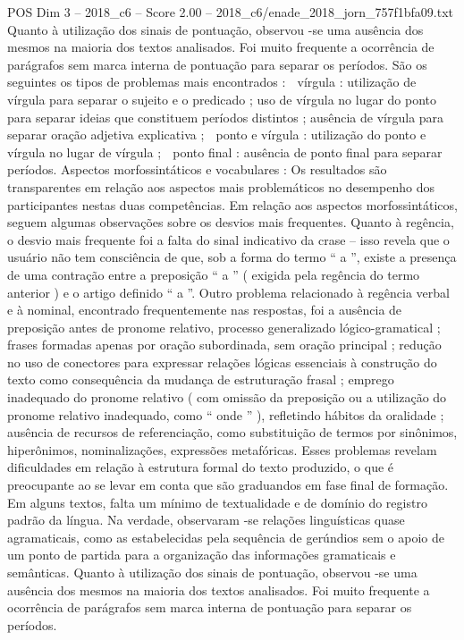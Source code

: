 \begin{textsample}{POS Dim 3 – 2018\_c6 – Score 2.00 – 2018\_c6/enade\_2018\_jorn\_757f1bfa09.txt}
Quanto à utilização dos sinais de pontuação, observou -se uma ausência dos mesmos na maioria dos textos analisados.
Foi muito frequente a ocorrência de parágrafos sem marca interna de pontuação para separar os períodos.
São os seguintes os tipos de problemas mais encontrados :  vírgula : utilização de vírgula para separar o sujeito e o predicado ; uso de vírgula no lugar do ponto para separar ideias que constituem períodos distintos ; ausência de vírgula para separar oração adjetiva explicativa ;  ponto e vírgula : utilização do ponto e vírgula no lugar de vírgula ;  ponto final : ausência de ponto final para separar períodos.
Aspectos morfossintáticos e vocabulares : Os resultados são transparentes em relação aos aspectos mais problemáticos no desempenho dos participantes nestas duas competências.
Em relação aos aspectos morfossintáticos, seguem algumas observações sobre os desvios mais frequentes.
Quanto à regência, o desvio mais frequente foi a falta do sinal indicativo da crase – isso revela que o usuário não tem consciência de que, sob a forma do termo “ a ”, existe a presença de uma contração entre a preposição “ a ” ( exigida pela regência do termo anterior ) e o artigo definido “ a ”.
Outro problema relacionado à regência verbal e à nominal, encontrado frequentemente nas respostas, foi a ausência de preposição antes de pronome relativo, processo generalizado lógico-gramatical ; frases formadas apenas por oração subordinada, sem oração principal ; redução no uso de conectores para expressar relações lógicas essenciais à construção do texto como consequência da mudança de estruturação frasal ; emprego inadequado do pronome relativo ( com omissão da preposição ou a utilização do pronome relativo inadequado, como “ onde ” ), refletindo hábitos da oralidade ; ausência de recursos de referenciação, como substituição de termos por sinônimos, hiperônimos, nominalizações, expressões metafóricas.
Esses problemas revelam dificuldades em relação à estrutura formal do texto produzido, o que é preocupante ao se levar em conta que são graduandos em fase final de formação.
Em alguns textos, falta um mínimo de textualidade e de domínio do registro padrão da língua.
Na verdade, observaram -se relações linguísticas quase agramaticais, como as estabelecidas pela sequência de gerúndios sem o apoio de um ponto de partida para a organização das informações gramaticais e semânticas.
Quanto à utilização dos sinais de pontuação, observou -se uma ausência dos mesmos na maioria dos textos analisados.
Foi muito frequente a ocorrência de parágrafos sem marca interna de pontuação para separar os períodos.

\end{textsample}
